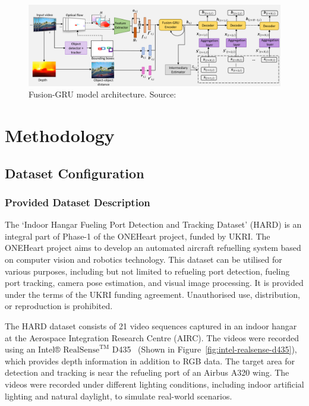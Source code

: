 \documentclass[12pt,oneside]{book} %
\begin{document}
\begin{figure}[H]
    \centering
    \includegraphics[width=1\textwidth]{figures/FusionGRU.png}
    \caption{Fusion-GRU model architecture. Source:~\citet{FusionGRU}}\label{fig:fusion-gru}
\end{figure}

\chapter{Methodology}\label{chap:methodology}
\section{Dataset Configuration}
\subsection{Provided Dataset Description}
The `Indoor Hangar Fueling Port Detection and Tracking Dataset' (HARD) is an
integral part of Phase-1 of the ONEHeart project, funded by UKRI. The ONEHeart
project aims to develop an automated aircraft refuelling system based on
computer vision and robotics technology. This dataset can be utilised for
various purposes, including but not limited to refueling port detection,
fueling port tracking, camera pose estimation, and visual image processing. It
is provided under the terms of the UKRI funding agreement. Unauthorised use,
distribution, or reproduction is prohibited.

The HARD dataset consists of 21 video sequences captured in an indoor hangar at
the Aerospace Integration Research Centre (AIRC). The videos were recorded
using an Intel® ${\text{RealSense}}^{\text{TM}}$ D435~\cite{IntelRealSense}
(Shown in Figure~\ref{fig:intel-realsense-d435}), which provides depth
information in addition to RGB data. The target area for detection and tracking
is near the refueling port of an Airbus A320 wing. The videos were recorded
under different lighting conditions, including indoor artificial lighting and
natural daylight, to simulate real-world scenarios.
\end{document}
